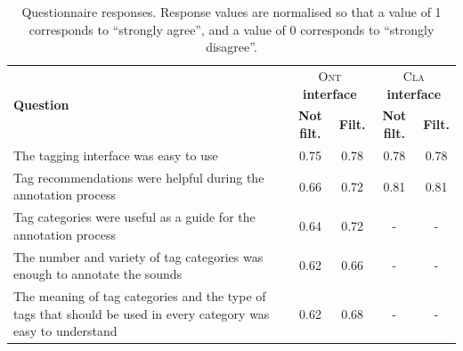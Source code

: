 \begin{table}
\footnotesize
{}
\begin{center}
\footnotesize
\begin{tabular}{@{}p{6.3cm}cccc@{}}
\toprule
\multirow{2}{6.3cm}{\textbf{Question}} & \multicolumn{2}{c}{\textsc{Ont} \textbf{interface}} & \multicolumn{2}{c}{\textsc{Cla} \textbf{interface}} \\
& \textbf{Not filt.} & \textbf{Filt.} & \textbf{Not filt.} & \textbf{Filt.} \\
\midrule
The tagging interface was easy to use & 0.75 & 0.78 & 0.78 & 0.78 \\
Tag recommendations were helpful during the annotation process & 0.66  & 0.72  & 0.81  & 0.81 \\
Tag categories were useful as a guide for the annotation process  & 0.64  & 0.72  & - & - \\
The number and variety of tag categories was enough to annotate the sounds & 0.62  & 0.66  & - & - \\ 
The meaning of tag categories and the type of tags that should be used in every category was easy to understand & 0.62  & 0.68  & - & - \\
\bottomrule
\end{tabular}
\caption[Questionnaire responses]{Questionnaire responses. Response values are normalised so that a value of 1 corresponds to ``strongly agree'', and a value of 0 corresponds to ``strongly disagree''. 
}
\label{tab:ontology:qualitative_results}
\end{center}
\end{table}




